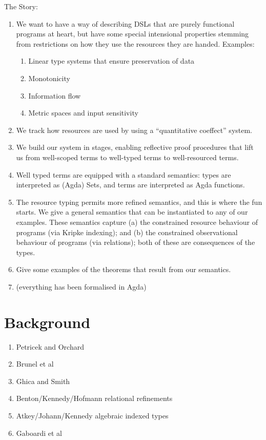 \documentclass[sigplan,review]{acmart}\settopmatter{printfolios=true,printccs=false,printacmref=false}
\begin{document}
The Story:
\begin{enumerate}
\item We want to have a way of describing DSLs that are purely
  functional programs at heart, but have some special intensional
  properties stemming from restrictions on how they use the resources
  they are handed. Examples:
  \begin{enumerate}
  \item Linear type systems that ensure preservation of data
  \item Monotonicity
  \item Information flow
  \item Metric spaces and input sensitivity
  \end{enumerate}
\item We track how resources are used by using a ``quantitative
  coeffect'' system.
\item We build our system in stages, enabling reflective proof
  procedures that lift us from well-scoped terms to well-typed terms
  to well-resourced terms.
\item Well typed terms are equipped with a standard semantics: types
  are interpreted as (Agda) Sets, and terms are interpreted as Agda
  functions.
\item The resource typing permits more refined semantics, and this is
  where the fun starts. We give a general semantics that can be
  instantiated to any of our examples. These semantics capture (a) the
  constrained resource behaviour of programs (via Kripke indexing);
  and (b) the constrained observational behaviour of programs (via
  relations); both of these are consequences of the types.
\item Give some examples of the theorems that result from our
  semantics.
\item (everything has been formalised in Agda)
\end{enumerate}

\section{Background}

\begin{enumerate}
\item Petricek and Orchard
\item Brunel et al
\item Ghica and Smith
\item Benton/Kennedy/Hofmann relational refinements
\item Atkey/Johann/Kennedy algebraic indexed types
\item Gaboardi et al
\end{enumerate}
\end{document}
